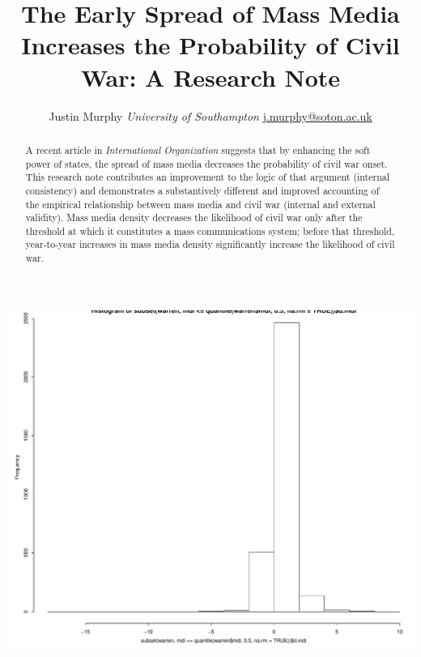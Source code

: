\documentclass[11pt,article,oneside]{memoir}
\title{The Early Spread of Mass Media Increases the Probability of Civil War: A
Research Note}
\author{\Large Justin Murphy\vspace{0.05in} \newline\normalsize\emph{University of Southampton} \newline\footnotesize \url{j.murphy@soton.ac.uk}\vspace*{0.2in}\newline }
\date{}
\makeatletter
\def\maxwidth{\ifdim\Gin@nat@width>\linewidth\linewidth
\else\Gin@nat@width\fi}
\let\Oldincludegraphics\includegraphics
\renewcommand{\includegraphics}[1]{\Oldincludegraphics[width=\maxwidth]{#1}}
\makeatother
\begin{document}
  
\setsansfont[Mapping=tex-text]{Gill Sans} 
\setmonofont[Mapping=tex-text,Scale=0.8]{Consolas}
\pagestyle{kjh}

\singlespacing


\maketitle



\vspace{-4ex}
\begin{abstract}

\noindent A recent article in \emph{International Organization} suggests that by
enhancing the soft power of states, the spread of mass media decreases
the probability of civil war onset. This research note contributes an
improvement to the logic of that argument (internal consistency) and
demonstrates a substantively different and improved accounting of the
empirical relationship between mass media and civil war (internal and
external validity). Mass media density decreases the likelihood of civil
war only after the threshold at which it constitutes a mass
communications system; before that threshold, year-to-year increases in
mass media density significantly increase the likelihood of civil war.

\end{abstract}

\newpage


\includegraphics{figure/unitroot.pdf} \onehalfspacing
\end{document}

